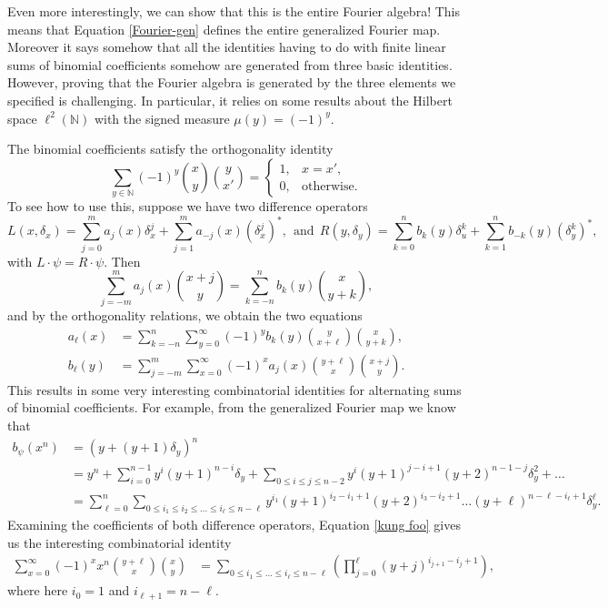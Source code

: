 \documentclass[11pt]{amsart}
\theoremstyle{plain}
\theoremstyle{named}
\begin{document}
Even more interestingly, we can show that this is the entire Fourier algebra!
This means that Equation \eqref{Fourier-gen} defines the entire generalized Fourier map.
Moreover it says somehow that all the identities having to do with finite linear sums of binomial coefficients somehow are generated from three basic identities.
However, proving that the Fourier algebra is generated by the three elements we specified is challenging.
In particular, it relies on some results about the Hilbert space $\ell^2(\mathbb{N})$ with the signed measure $\mu(y) = (-1)^y$.

The binomial coefficients satisfy the orthogonality identity
\begin{equation}\label{orthogonal}\sum_{y\in\mathbb N}(-1)^y\binom{x}{y}\binom{y}{x'} = \left\lbrace\begin{array}{cc}
1, & x=x',\\
0, & \text{otherwise}.
\end{array}\right.\end{equation}
To see how to use this, suppose we have two difference operators
$$L(x,\delta_x) = \sum_{j=0}^m a_j(x)\delta_x^j + \sum_{j=1}^{m} a_{-j}(x)(\delta_x^j)^*,\ \ \text{and}\ \ R(y,\delta_y) = \sum_{k=0}^n b_k(y)\delta_u^k + \sum_{k=1}^{n} b_{-k}(y)(\delta_y^k)^*,$$
with $L\cdot\psi = R\cdot\psi$.
Then
$$\sum_{j=-m}^m a_j(x)\binom{x+j}{y} = \sum_{k=-n}^n b_k(y)\binom{x}{y+k},$$
and by the orthogonality relations, we obtain the two equations
\begin{align}\label{kung foo}
a_{\ell}(x) &= \sum_{k=-n}^n\sum_{y=0}^\infty (-1)^y b_k(y)\binom{y}{x+\ell} \binom{x}{y+k},\\
b_{\ell}(y) &= \sum_{j=-m}^m \sum_{x=0}^\infty (-1)^x a_j(x)\binom{y+\ell}{x} \binom{x+j}{y}.
\end{align}
This results in some very interesting combinatorial identities for alternating sums of binomial coefficients.
For example, from the generalized Fourier map we know that
\begin{align*}
b_\psi(x^n)
 & =  (y + (y+1)\delta_y)^n\\
 & = y^n + \sum_{i=0}^{n-1}y^i(y+1)^{n-i} \delta_y + \sum_{0\leq i\leq j\leq n-2} y^i(y+1)^{j-i+1}(y+2)^{n-1-j}\delta_y^2 + \dots\\
 & = \sum_{\ell=0}^n \sum_{0\leq i_1\leq i_2\leq \dots\leq i_\ell\leq n-\ell} y^{i_1}(y+1)^{i_2-i_1+1}(y+2)^{i_3-i_2+1}\dots (y+\ell)^{n-\ell-i_\ell+1}\delta_y^{\ell}.
\end{align*}
Examining the coefficients of both difference operators, Equation \eqref{kung foo} gives us the interesting combinatorial identity
\begin{align}\label{fubar}
\sum_{x=0}^\infty (-1)^x x^n\binom{y+\ell}{x} \binom{x}{y}
 & = \sum_{0\leq i_1\leq \dots\leq i_\ell\leq n-\ell} \left(\prod_{j=0}^{\ell}(y+j)^{i_{j+1}-i_j+1}\right),
\end{align}
where here $i_0 = 1$ and $i_{\ell+1} = n-\ell$.
\end{document}
